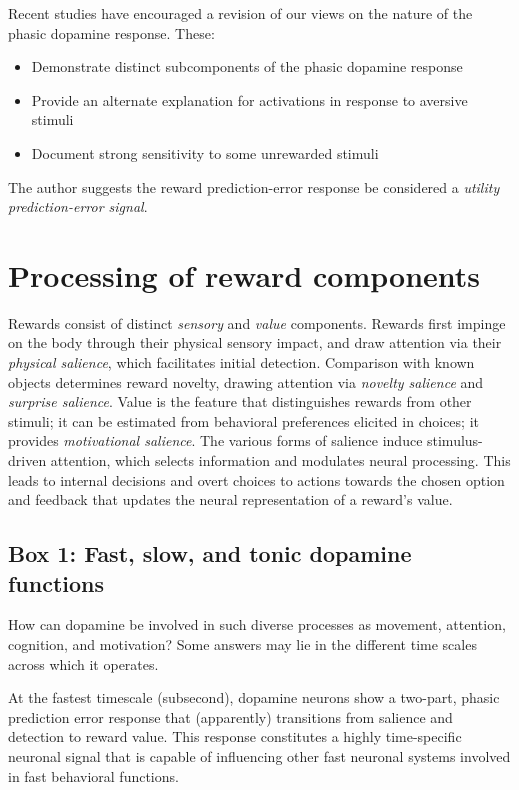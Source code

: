 \documentclass{article}
\numberwithin{equation}{section}
\begin{document}
Recent studies have encouraged a revision of our views on the nature of the phasic dopamine response. These:

\begin{itemize}
\item Demonstrate distinct subcomponents of the phasic dopamine response
\item Provide an alternate explanation for activations in response to aversive stimuli
\item Document strong sensitivity to some unrewarded stimuli
\end{itemize}

The author suggests the reward prediction-error response be considered a \textit{utility prediction-error signal}.

\section{Processing of reward components}

Rewards consist of distinct \textit{sensory} and \textit{value} components. Rewards first impinge on the body through their physical sensory impact, and draw attention via their \textit{physical salience}, which facilitates initial detection. Comparison with known objects determines reward novelty, drawing attention via \textit{novelty salience} and \textit{surprise salience}. Value is the feature that distinguishes rewards from other stimuli; it can be estimated from behavioral preferences elicited in choices; it provides \textit{motivational salience}. The various forms of salience induce stimulus-driven attention, which selects information and modulates neural processing. This leads to internal decisions and overt choices to actions towards the chosen option and feedback that updates the neural representation of a reward's value.

\subsection{Box 1: Fast, slow, and tonic dopamine functions}

How can dopamine be involved in such diverse processes as movement, attention, cognition, and motivation? Some answers may lie in the different time scales across which it operates.

At the fastest timescale (subsecond), dopamine neurons show a two-part, phasic prediction error response that (apparently) transitions from salience and detection to reward value. This response constitutes a highly time-specific neuronal signal that is capable of influencing other fast neuronal systems involved in fast behavioral functions.
\end{document}
